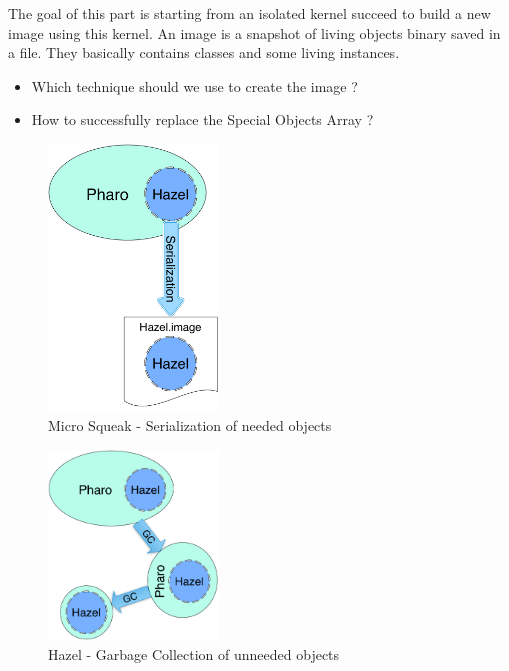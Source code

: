 \goal The goal of this part is starting from an isolated kernel succeed to build a new image using this kernel. An image is a snapshot of living objects binary saved in a file. They basically contains classes and some living instances.

\problems
\begin{itemize}
	\item Which technique should we use to create the image ?
	\item How to successfully replace the \gls{Special Objects Array} ?
\end{itemize}

\solutions
\begin{figure}[ht]
	\centering\includegraphics[width = 4.5cm]{figures/MSSolution}
	\caption{Micro Squeak - Serialization of needed objects}
	\label{MSSolution}
\end{figure}
\begin{figure}[ht]
	\centering\includegraphics[width = 4.5cm]{figures/HazelSolution}
	\caption{Hazel - Garbage Collection of unneeded objects}
	\label{HazelSolution}
\end{figure}

